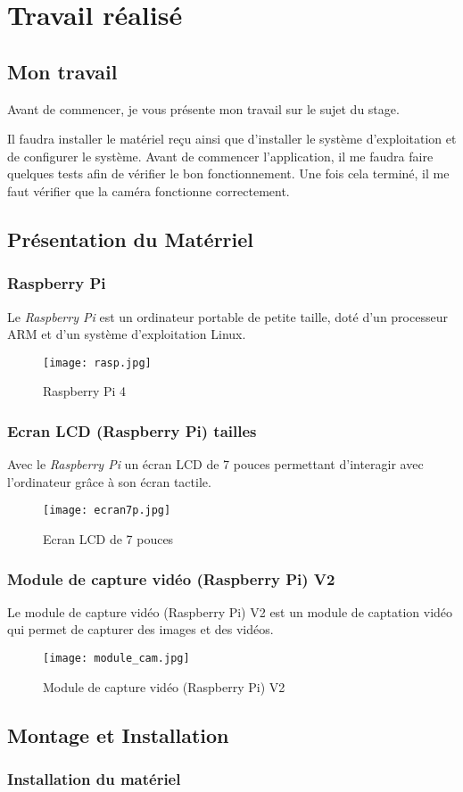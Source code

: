 \chapter{Travail réalisé}
    \section{Mon travail}
    Avant de commencer, je vous présente mon travail sur le sujet du stage.

    \vspace{0.2cm}

    Il faudra installer le matériel reçu ainsi que d'installer le système d'exploitation et de configurer le système.
    Avant de commencer l'application, il me faudra faire quelques tests afin de vérifier le bon fonctionnement.
    Une fois cela terminé, il me faut vérifier que la caméra fonctionne correctement.

    \section{Présentation du Matérriel}
        \subsection{Raspberry Pi}
        Le \textit{Raspberry Pi} est un ordinateur portable de petite taille, doté d'un processeur ARM et d'un système d'exploitation Linux.
        \begin{figure}[h]
            \centering
            \texttt{[image: rasp.jpg]}
            \caption{Raspberry Pi 4}
        \end{figure}

        \subsection{Ecran LCD (Raspberry Pi) tailles}
        Avec le \textit{Raspberry Pi} un écran LCD de 7 pouces permettant d'interagir avec l'ordinateur grâce à son écran tactile. 
        \begin{figure}[h]
            \centering
            \texttt{[image: ecran7p.jpg]} 
            \caption{Ecran LCD de 7 pouces}
        \end{figure}

        \vspace{1cm}

        \subsection{Module de capture vidéo (Raspberry Pi) V2}
        Le module de capture vidéo (Raspberry Pi) V2 est un module de captation vidéo qui permet de capturer des images et des vidéos.
        \begin{figure}[h]
            \centering        
            \texttt{[image: module\_cam.jpg]}
            \caption{Module de capture vidéo (Raspberry Pi) V2}
        \end{figure}
        
    \section{Montage et Installation}
        \subsection{Installation du matériel}
        
